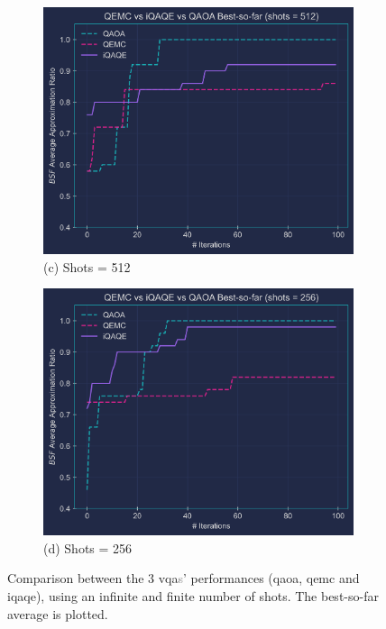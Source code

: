 \begin{figure}[ht!]

  \begin{subfigure}[t]{0.495\textwidth}
      \centering
      \includegraphics[width=1\textwidth]{Figures/Chapter_5/3_Comparison_512.png}
      \caption*{(c) Shots = 512}
      \label{fig:3_Comparison_shots=512}
  \end{subfigure}
  \begin{subfigure}[t]{0.495\textwidth}
      \centering
      \includegraphics[width=1\textwidth]{Figures/Chapter_5/3_Comparison_256.png}
      \caption*{(d) Shots = 256}
      \label{fig:3_Comparison_shots=256}
  \end{subfigure}
  
  \caption{Comparison between the $3$ \acrshort{vqa}\textcolor{gray}{s}' performances (\acrshort{qaoa}, \acrshort{qemc} and \acrshort{iqaqe}), using an infinite and finite number of shots. The best-so-far average is plotted.}
  \label{fig:3_Comparison_shots}
\end{figure}


